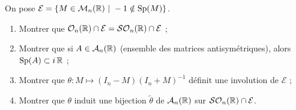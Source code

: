 \begin{exo}
	\label{euclidiens1}
	On pose $\mathcal E=\lbrace M\in\mathcal M_n(\R)\ |\ -1\notin \Sp(M)\rbrace$.
	\begin{enumerate}
		\item Montrer que $\mathcal O_n(\operatorname{\mathbb R})\cap \mathcal E=\mathcal{SO}_n(\operatorname{\mathbb R})\cap \mathcal E$ ;
		\item Montrer que si $A\in\mathcal A_n(\operatorname{\mathbb R})$ (ensemble des matrices antisymétriques), alors $\operatorname{Sp}(A)\subset i\operatorname{\mathbb R}$ ;
		\item Montrer que $\theta : M \mapsto (I_n-M)(I_n+M)^{-1}$ définit une involution de $\mathcal E$ ;
		\item Montrer que $\theta$ induit une bijection $\tilde\theta$ de $\mathcal A_n(\operatorname{\mathbb R})$ sur $\mathcal{SO}_n(\operatorname{\mathbb R})\cap \mathcal E$.
	\end{enumerate}
\end{exo}

